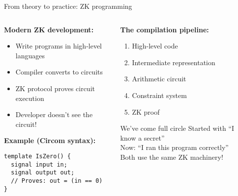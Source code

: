 \documentclass[aspectratio=169, lualatex, handout]{beamer}
\begin{document}
\begin{frame}[fragile]{From theory to practice: ZK programming}
	\begin{columns}[c]
		\begin{column}{0.5\textwidth}
			\textbf{Modern ZK development:}
			\begin{itemize}
				\item Write programs in high-level languages
				\item Compiler converts to circuits
				\item ZK protocol proves circuit execution
				\item Developer doesn't see the circuit!
			\end{itemize}
			\vspace{0.5em}
			\textbf{Example (Circom syntax):}
			\begin{verbatim}
template IsZero() {
  signal input in;
  signal output out;
  // Proves: out = (in == 0)
}
   \end{verbatim}
		\end{column}
		\begin{column}{0.5\textwidth}
			\textbf{The compilation pipeline:}
			\begin{enumerate}
				\item High-level code
				\item Intermediate representation
				\item Arithmetic circuit
				\item Constraint system
				\item ZK proof
			\end{enumerate}
			\vspace{0.5em}
			\begin{alertblock}{We've come full circle}
				Started with ``I know a secret''\\
				Now: ``I ran this program correctly''\\
				Both use the same ZK machinery!
			\end{alertblock}
		\end{column}
	\end{columns}
\end{frame}
\end{document}
